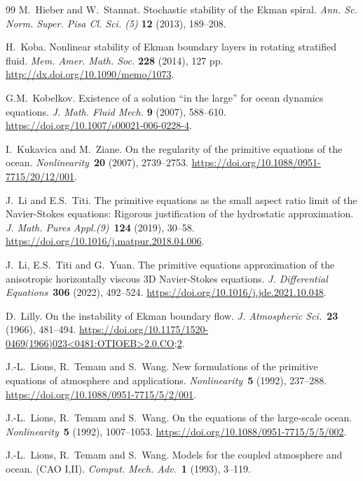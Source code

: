 \documentclass[preprint]{elsarticle}
\numberwithin{equation}{section}
\begin{document}
\begin{thebibliography}{99}
	M.~Hieber and W.~Stannat.
	Stochastic stability of the Ekman spiral.
	{\em Ann. Sc. Norm. Super. Pisa Cl. Sci. (5)} \textbf{12} (2013), 189--208. 
	
	H.~Koba.
	Nonlinear stability of Ekman boundary layers in rotating stratified fluid.
	\textit{Mem. Amer. Math. Soc.} \textbf{228} (2014), 127 pp.
	\url{http://dx.doi.org/10.1090/memo/1073}. 
	
	G.M.~Kobelkov.
	Existence of a solution ``in the large'' for ocean dynamics equations.
	\textit{J. Math. Fluid Mech.} \textbf{9} (2007), 588--610.
	\url{https://doi.org/10.1007/s00021-006-0228-4}. 
	
	I.~Kukavica and M.~Ziane.
	On the regularity of the primitive equations of the ocean.
	\textit{Nonlinearity}~\textbf{20} (2007), 2739--2753.
	\url{https://doi.org/10.1088/0951-7715/20/12/001}.
	
	J.~Li and E.S.~Titi.
	The primitive equations as the small aspect ratio limit of the Navier-Stokes equations: Rigorous justification of the hydrostatic approximation.
	\textit{J. Math. Pures Appl.(9)}~\textbf{124} (2019), 30--58.
	\url{https://doi.org/10.1016/j.matpur.2018.04.006}.
	
	J.~Li, E.S.~Titi and G.~Yuan.
	The primitive equations approximation of the anisotropic horizontally viscous 3D Navier-Stokes equations.
	\textit{J. Differential Equations}~\textbf{306} (2022), 492--524.
	\url{https://doi.org/10.1016/j.jde.2021.10.048}.
	
	D.~Lilly. 
	On the instability of Ekman boundary flow. 
	\textit{J. Atmospheric Sci.}~\textbf{23} (1966),
	481--494.
	\url{https://doi.org/10.1175/1520-0469(1966)023<0481:OTIOEB>2.0.CO;2}. 
	
	J.-L.~Lions, R.~Temam and S.~Wang.
	New formulations of the primitive equations of atmosphere and applications.
	\textit{Nonlinearity}~\textbf{5} (1992), 237--288.
	\url{https://doi.org/10.1088/0951-7715/5/2/001}.
	
	J.-L.~Lions, R.~Temam and S.~Wang.
	On the equations of the large-scale ocean.
	\textit{Nonlinearity}~\textbf{5} (1992), 1007--1053.
	\url{https://doi.org/10.1088/0951-7715/5/5/002}.
	
	J.-L.~Lions, R.~Temam and S.~Wang.
	Models for the coupled atmosphere and ocean. (CAO I,II).
	\textit{Comput. Mech. Adv.}~\textbf{1} (1993), 3--119.
	

\end{thebibliography}
\end{document}
